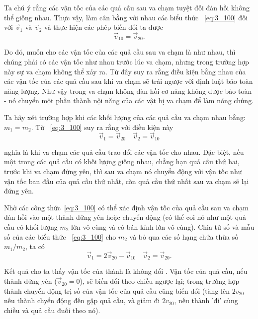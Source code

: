 Ta chú ý rằng các vận tốc của các quả cầu sau va chạm tuyệt đối đàn hồi không thể giống nhau. Thực vậy, làm cân bằng với nhau các biểu thức ~\eqref{eq:3_100} đối với $\vec{v}_1$ và $\vec{v}_2$ và thực hiện các phép biến đổi ta được 
\begin{equation*}
\vec{v}_{10} = \vec{v}_{20}.
\end{equation*}

\noindent
Do đó, muốn cho các vận tốc của các quả cầu sau va chạm là như nhau, thì chúng phải có các vận tốc như nhau trước lúc va chạm, nhưng trong trường hợp này sự va chạm không thể xảy ra. Từ đây suy ra rằng điều kiện bằng nhau của các vận tốc của các quả cầu sau khi va chạm sẽ trái ngược với định luật bảo toàn năng lượng. Như vậy trong va chạm không đàn hồi cơ năng không được bảo toàn - nó chuyển một phần thành nội năng của các vật bị va chạm để làm nóng chúng. 

Ta hãy xét trường hợp khi các khối lượng của các quả cầu va chạm nhau bằng: $m_1=m_2$. Từ ~\eqref{eq:3_100} suy ra rằng với điều kiện này 
\begin{equation*}
\vec{v}_{1} = \vec{v}_{20}\quad \vec{v}_{2} = \vec{v}_{10}
\end{equation*}

\noindent
nghĩa là khi va chạm các quả cầu trao đổi các vận tốc cho nhau. Đặc biệt, nếu một trong các quả cầu có khối lượng giống nhau, chẳng hạn quả cầu thứ hai, trước khi va chạm đứng yên, thì sau va chạm nó chuyển động với vận tốc như vận tốc ban đầu của quả cầu thứ nhất, còn quả cầu thứ nhất sau va chạm sẽ lại đứng yên. 

Nhờ các công thức~\eqref{eq:3_100} có thể xác định vận tốc của quả cầu sau va chạm đàn hồi vào một thành đứng yên hoặc chuyển động   (có thể coi nó như một quả cầu có khối lượng $m_2$ lớn vô cùng và có bán kính lớn vô cùng). Chia tử số và mẫu số của các biểu thức ~\eqref{eq:3_100} cho $m_2$ và bỏ qua các số hạng chứa thừa số $m_1/m_2$, ta có
\begin{equation*}
\vec{v}_{1} = 2\vec{v}_{20}-\vec{v}_{10}\quad \vec{v}_{2} = \vec{v}_{20}.
\end{equation*}

\noindent
Kết quả cho ta thấy vận tốc của thành là không đổi . Vận tốc của quả cầu, nếu thành đứng yên ($\vec{v}_{20}=0$), sẽ biến đổi theo chiều ngược lại; trong trường hợp thành chuyển động trị số của vận tốc của quả cầu cũng biến đổi  (tăng lên $2v_{20}$ nếu thành chyển động đến gặp quả cầu, và giảm đi $2v_{20}$, nếu thành 'đi' cùng chiều và quả cầu đuối theo nó).

